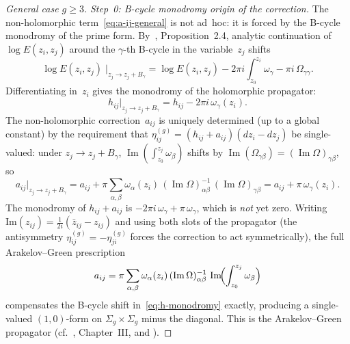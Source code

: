 \begin{proof}[General case $g \geq 3$]
\emph{Step~0: B-cycle monodromy origin of the correction.}
The non-holomorphic term~\eqref{eq:a-ij-general} is not
ad~hoc: it is forced by the B-cycle monodromy of the prime
form. By~\cite{Fay73}, Proposition~2.4, analytic
continuation of $\log E(z_i, z_j)$ around the $\gamma$-th
B-cycle in the variable~$z_j$ shifts
\begin{equation}\label{eq:b-cycle-monodromy-log-E}
\log E(z_i, z_j)\;\Big|_{z_j \to z_j + B_\gamma}
= \log E(z_i, z_j) - 2\pi i\!\int_{z_0}^{z_i}\!\omega_\gamma
 - \pi i\,\Omega_{\gamma\gamma}.
\end{equation}
Differentiating in~$z_i$ gives the monodromy of the
holomorphic propagator:
\begin{equation}\label{eq:h-monodromy}
h_{ij}\big|_{z_j \to z_j + B_\gamma}
= h_{ij} - 2\pi i\,\omega_\gamma(z_i).
\end{equation}
The non-holomorphic correction~$a_{ij}$ is uniquely determined
(up to a global constant) by the requirement that
$\eta_{ij}^{(g)} = (h_{ij} + a_{ij})(dz_i - dz_j)$ be
single-valued: under $z_j \to z_j + B_\gamma$,
$\operatorname{Im}(\int_{z_0}^{z_j}\omega_\beta)$ shifts by
$\operatorname{Im}(\Omega_{\gamma\beta})
= (\operatorname{Im}\Omega)_{\gamma\beta}$, so
\[
a_{ij}\big|_{z_j \to z_j + B_\gamma}
= a_{ij} + \pi \sum_{\alpha,\beta}
 \omega_\alpha(z_i)\,(\operatorname{Im}\Omega)^{-1}_{\alpha\beta}\,
 (\operatorname{Im}\Omega)_{\gamma\beta}
= a_{ij} + \pi\,\omega_\gamma(z_i).
\]
The monodromy of $h_{ij} + a_{ij}$ is
$-2\pi i\,\omega_\gamma + \pi\,\omega_\gamma$, which is
\emph{not} yet zero. Writing $\mathrm{Im}(z_{ij})
= \frac{1}{2i}(\bar{z}_{ij} - z_{ij})$ and using both
slots of the propagator (the antisymmetry
$\eta_{ij}^{(g)} = -\eta_{ji}^{(g)}$ forces
the correction to act symmetrically), the full
Arakelov--Green prescription
\[
a_{ij} = \pi\sum_{\alpha,\beta}\omega_\alpha(z_i)\,
 (\operatorname{Im}\Omega)^{-1}_{\alpha\beta}\,
 \operatorname{Im}\!\Bigl(\int_{z_0}^{z_j}\omega_\beta\Bigr)
\]
compensates the B-cycle shift in~\eqref{eq:h-monodromy}
exactly, producing a single-valued $(1,0)$-form on
$\Sigma_g \times \Sigma_g$ minus the diagonal.
This is the Arakelov--Green propagator
(cf.~\cite{Fay73}, Chapter~III, and \cite{dH89}).


\end{proof}
